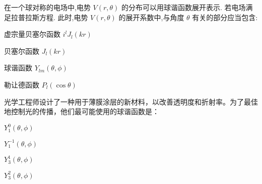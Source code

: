 \documentclass{njustexam}
\begin{document}
\begin{problem}
  在一个球对称的电场中,电势 $V(r, \theta)$ 的分布可以用球谐函数展开表示.
  若电场满足拉普拉斯方程.
  此时,电势 $V(r, \theta)$ 的展开系数中,与角度 $\theta$ 有关的部分应当包含: 
  \begin{abcd}
  \item 虚宗量贝塞尔函数 $i^l J_l(kr)$
  \item 贝塞尔函数 $J_l(kr)$
  \item 球谐函数 $Y_{lm}(\theta, \phi)$
  \item 勒让德函数 $P_l(\cos\theta)$

  \end{abcd}
\end{problem}



  
  
  

  \begin{problem}
    光学工程师设计了一种用于薄膜涂层的新材料，以改善透明度和折射率。为了最佳地控制光的传播，他们最可能使用的球谐函数是：
    \begin{abcd}

    \item $Y_{1}^0(\theta, \phi)$
    
    \item $Y_{1}^{-1}(\theta, \phi)$
    
    \item $Y_{3}^1(\theta, \phi)$
    
    \item $Y_{3}^2(\theta, \phi)$
   \end{abcd}

  \end{problem}
\end{document}
